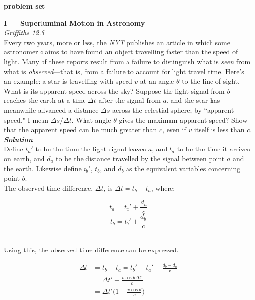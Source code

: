 \documentclass[9pt]{extarticle}
\newcommand{\bfit}[1]{\textbf{\textit{#1}}}
\begin{document}
\setlength{\parindent}{0pt}

{\huge \bf problem set} 

\noindent \hrulefill

\begin{multicols*}{2}

{\LARGE \bf I --- Superluminal Motion in Astronomy} \\

{\it Griffiths 12.6} \\ 

Every two years, more or less, the {\it NYT} publishes an article in which some astronomer claims to have found an object travelling faster than the speed of light. Many of these reports result from a failure to distinguish what is {\it seen} from what is {\it observed}---that is, from a failure to account for light travel time. Here's an example: a star is travelling with speed $v$ at an angle $\theta$ to the line of sight. What is its apparent speed across the sky? Suppose the light signal from $b$ reaches the earth at a time $\Delta t$ after the signal from $a$, and the star has meanwhile advanced a distance $\Delta s$ across the celestial sphere; by ``apparent speed," I mean $\Delta s / \Delta t$. What angle $\theta$ gives the maximum apparent speed? Show that the apparent speed can be much greater than $c$, even if $v$ itself is less than $c$. \\ 

{\bfit{Solution}} \\ 

Define $t_a'$ to be the time the light signal leaves $a$, and $t_a$ to be the time it arrives on earth, and $d_a$ to be the distance travelled by the signal between point $a$ and the earth. Likewise define $t_b'$, $t_b$, and $d_b$ as the equivalent variables concerning point $b$.  \\ 

The observed time difference, $\Delta t$, is $\Delta t = t_b - t_a$, where:

$$t_a = t_a' + \frac{d_a}{c}$$
$$t_b = t_b' + \frac{d_b}{c}$$ \ 

Using this, the observed time difference can be expressed:

$$
\begin{aligned}
	\Delta t &= t_b - t_a = t_b' - t_a' - \frac{d_b-d_a}{c} \\  
	&= \Delta t' - \frac{v\cos\theta \Delta t'}{c} \\ 
	&= \Delta t' \bigg(1 - \frac{v\cos\theta}{c} \bigg)
\end{aligned}
$$ \ 


\end{multicols*}
\end{document}
